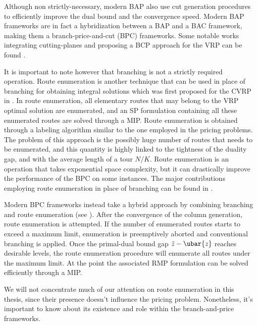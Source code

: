 Although non strictly-necessary, modern BAP also use
cut generation procedures to efficiently improve the dual bound and the convergence speed.
Modern BAP frameworks
are in fact a hybridization between a BAP and a BAC framework,
making them a branch-price-and-cut (BPC) frameworks.
Some notable works integrating cutting-planes and proposing
a BCP approach for the VRP can be found \textcite{fukasawa2006, ropke2012}.

\medskip

It is important to note however that branching is not a strictly required operation.
Route enumeration is another technique that can be used in place of branching
for obtaining integral solutions which was first proposed for the CVRP in \textcite{baldacci2008}.
In route enumeration, all elementary routes that may belong to the VRP optimal solution are enumerated,
and an SP formulation containing all these enumerated routes are solved through a MIP.
Route enumeration is obtained through a labeling algorithm similar to the one employed in the pricing problems.
The problem of this approach is the possibly huge number of routes that needs to be enumerated,
and this quantity is highly linked to the tightness of the duality gap,
and with the average length of a tour $N / K$.
Route enumeration is an operation that takes exponential space complexity,
but it can drastically improve the performance of the BPC on some instances.
The major contributions employing route enumeration in place of branching can be found in
\textcite{baldacci2008,baldacci2011}.

Modern BPC frameworks instead take a hybrid approach by combining branching and route enumeration
(see \cite{pessoa2008, pessoa2009,contardo2014,pecin2017,pecin2017b,pessoa2020}).
After the convergence of the column generation, route enumeration is attempted.
If the number of enumerated routes starts to exceed a maximum limit, enumeration
is preemptively aborted and conventional branching is applied.
Once the primal-dual bound gap $\bar{z} - \ubar{z}$ reaches desirable levels, the route enumeration
procedure will enumerate all routes under the maximum limit.
At the point the associated RMP formulation can be solved efficiently through a MIP.

We will not concentrate much of our attention on route enumeration in this
thesis, since their presence doesn't influence the pricing problem.
Nonetheless, it's important to know about its existence and role within
the branch-and-price frameworks.

\medskip

